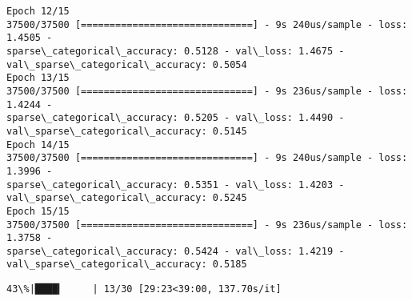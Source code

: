 \documentclass[11pt]{article}
\begin{document}
\begin{Verbatim}[commandchars=\\\{\}]
Epoch 12/15
37500/37500 [==============================] - 9s 240us/sample - loss: 1.4505 -
sparse\_categorical\_accuracy: 0.5128 - val\_loss: 1.4675 -
val\_sparse\_categorical\_accuracy: 0.5054
Epoch 13/15
37500/37500 [==============================] - 9s 236us/sample - loss: 1.4244 -
sparse\_categorical\_accuracy: 0.5205 - val\_loss: 1.4490 -
val\_sparse\_categorical\_accuracy: 0.5145
Epoch 14/15
37500/37500 [==============================] - 9s 240us/sample - loss: 1.3996 -
sparse\_categorical\_accuracy: 0.5351 - val\_loss: 1.4203 -
val\_sparse\_categorical\_accuracy: 0.5245
Epoch 15/15
37500/37500 [==============================] - 9s 236us/sample - loss: 1.3758 -
sparse\_categorical\_accuracy: 0.5424 - val\_loss: 1.4219 -
val\_sparse\_categorical\_accuracy: 0.5185
    \end{Verbatim}

    \begin{Verbatim}[commandchars=\\\{\}]
 43\%|████▎     | 13/30 [29:23<39:00, 137.70s/it]
    \end{Verbatim}
\end{document}
